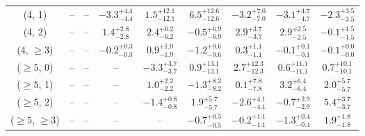 \begin{table}[h!]
{\begin{tabular}{ccccccccc}
	(4, 1) & -- & -- & $-3.3^{+ 4.4 }_{- 4.4 }$ & $1.5^{+ 12.1 }_{- 12.1 }$ & $6.5^{+ 12.6 }_{- 12.6 }$ & $-3.2^{+ 7.0 }_{- 7.0 }$ & $-3.1^{+ 4.7 }_{- 4.7 }$ & $-2.3^{+ 3.5 }_{- 3.5 }$ \\[0.5ex] 
	(4, 2) & -- & -- & $1.4^{+ 2.8 }_{- 2.8 }$ & $2.4^{+ 6.2 }_{- 6.2 }$ & $-0.5^{+ 6.9 }_{- 6.9 }$ & $2.9^{+ 3.7 }_{- 3.7 }$ & $2.9^{+ 2.5 }_{- 2.5 }$ & $-0.1^{+ 1.5 }_{- 1.5 }$ \\[0.5ex] 
	(4, $\ge3$) & -- & -- & $-0.2^{+ 0.3 }_{- 0.3 }$ & $0.9^{+ 1.9 }_{- 1.9 }$ & $-1.2^{+ 0.6 }_{- 0.6 }$ & $0.3^{+ 1.1 }_{- 1.1 }$ & $-0.1^{+ 0.1 }_{- 0.1 }$ & $-0.1^{+ 0.0 }_{- 0.0 }$ \\[0.5ex] 
	($\ge5$, 0) & -- & -- & -- & $-3.3^{+ 3.7 }_{- 3.7 }$ & $0.9^{+ 13.1 }_{- 13.1 }$ & $2.7^{+ 12.3 }_{- 12.3 }$ & $0.6^{+ 11.1 }_{- 11.1 }$ & $0.7^{+ 10.1 }_{- 10.1 }$ \\[0.5ex] 
	($\ge5$, 1) & -- & -- & -- & $1.0^{+ 2.2 }_{- 2.2 }$ & $-1.3^{+ 8.2 }_{- 8.2 }$ & $0.1^{+ 7.8 }_{- 7.8 }$ & $3.2^{+ 6.4 }_{- 6.4 }$ & $2.0^{+ 5.7 }_{- 5.7 }$ \\[0.5ex] 
	($\ge5$, 2) & -- & -- & -- & $-1.4^{+ 0.8 }_{- 0.8 }$ & $1.9^{+ 5.7 }_{- 5.7 }$ & $-2.6^{+ 4.1 }_{- 4.1 }$ & $-0.7^{+ 2.9 }_{- 2.9 }$ & $5.4^{+ 3.7 }_{- 3.7 }$ \\[0.5ex] 
	($\ge5$, $\ge3$) & -- & -- & -- & -- & $-0.7^{+ 0.5 }_{- 0.5 }$ & $-0.2^{+ 1.1 }_{- 1.1 }$ & $-1.3^{+ 0.4 }_{- 0.4 }$ & $1.9^{+ 1.8 }_{- 1.8 }$ \\[0.5ex] 
	\hline
	\hline
\end{tabular}}
\end{table}
